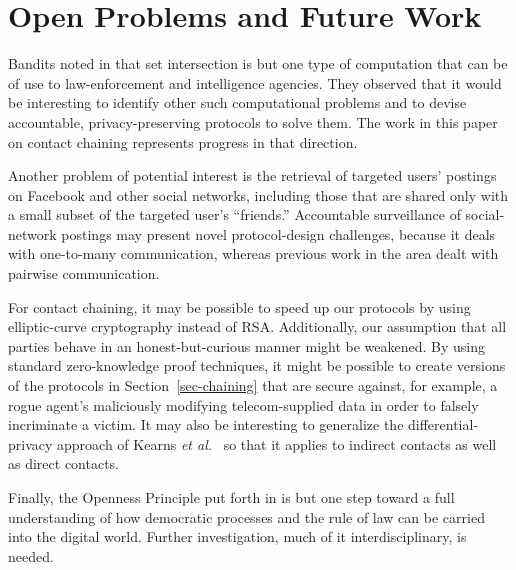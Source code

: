 \section{Open Problems and Future Work}\label{sec-future}
Bandits noted in \cite[Section 6.1]{sff-foci2014} that
set intersection is but one type of computation that can be of use
to law-enforcement and intelligence agencies.  They observed that it 
would be interesting to identify other such computational problems 
and to devise accountable, privacy-preserving protocols to solve them.  
The work in this paper on contact chaining represents progress in that
direction.  

Another problem of potential interest is the retrieval of
targeted users' postings on Facebook and other social networks, including 
those that are shared only with a small subset of the targeted user's 
``friends.'' Accountable surveillance of social-network postings may present 
novel protocol-design challenges, because it deals with one-to-many 
communication, whereas previous work in the area dealt with pairwise 
communication.

For contact chaining, it may be possible to speed up our protocols by using
elliptic-curve cryptography instead of RSA. Additionally, our assumption that
all parties behave in an honest-but-curious manner might be weakened. By using
standard zero-knowledge proof techniques, it might be possible to create versions
of the protocols in Section~\ref{sec-chaining} that are secure against, for
example, a rogue agent's maliciously modifying telecom-supplied data in order
to falsely incriminate a victim. It may also be interesting to 
generalize the differential-privacy approach of Kearns {\it et 
al.}~\cite{krwy-pnas16} so that it applies to indirect contacts as well as
direct contacts.



Finally, the Openness Principle put forth in \cite{sff-foci2014} is but one step
toward a full understanding of how democratic processes and the rule of law
can be carried into the digital world.  Further investigation, much of it
interdisciplinary, is needed.

